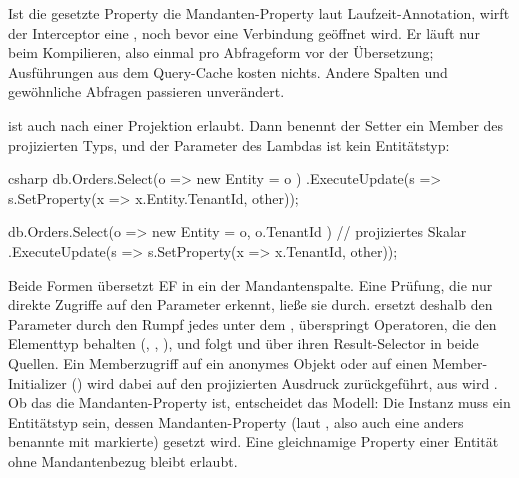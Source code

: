 Ist die gesetzte Property die Mandanten-Property laut Laufzeit-Annotation, wirft der
Interceptor eine , noch bevor eine Verbindung geöffnet wird.
Er läuft nur beim Kompilieren, also einmal pro Abfrageform vor der Übersetzung; Ausführungen
aus dem Query-Cache kosten nichts. Andere Spalten und gewöhnliche Abfragen passieren unverändert.

 ist auch nach einer Projektion erlaubt. Dann benennt der
Setter ein Member des projizierten Typs, und der Parameter des Lambdas ist kein Entitätstyp:

\begin{sourcecode}{csharp}
db.Orders.Select(o => new { Entity = o })
    .ExecuteUpdate(s => s.SetProperty(x => x.Entity.TenantId, other));

db.Orders.Select(o => new { Entity = o, o.TenantId })      // projiziertes Skalar
    .ExecuteUpdate(s => s.SetProperty(x => x.TenantId, other));
\end{sourcecode}

Beide Formen übersetzt EF in ein  der Mandantenspalte. Eine Prüfung, die nur
direkte Zugriffe auf den Parameter erkennt, ließe sie durch.  ersetzt deshalb den
Parameter durch den Rumpf jedes  unter dem ,
überspringt Operatoren, die den Elementtyp behalten (, ,
), und folgt  und  über ihren
Result-Selector in beide Quellen. Ein Memberzugriff auf ein anonymes Objekt oder auf einen
Member-Initializer () wird dabei auf den projizierten Ausdruck
zurückgeführt, aus  wird
. Ob das die Mandanten-Property ist, entscheidet
das Modell: Die Instanz muss ein Entitätstyp sein, dessen Mandanten-Property (laut
, also auch eine anders benannte
mit  markierte) gesetzt wird. Eine
gleichnamige Property einer Entität ohne Mandantenbezug bleibt erlaubt.

